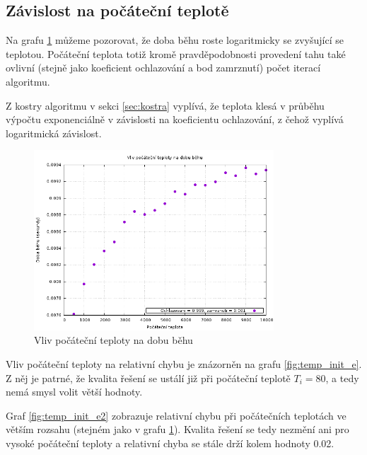 \documentclass[11pt]{article}
\begin{document}
\subsection{Závislost na počáteční teplotě}
\label{sec:temp}

Na grafu \ref{fig:temp_init} můžeme pozorovat, že doba běhu roste logaritmicky se zvyšující se teplotou. Počáteční teplota totiž kromě pravděpodobnosti provedení tahu také ovlivní (stejně jako koeficient ochlazování a bod zamrznutí) počet iterací algoritmu. 

Z kostry algoritmu v sekci \ref{sec:kostra} vyplívá, že teplota klesá v průběhu výpočtu exponenciálně v závislosti na koeficientu ochlazování, z čehož vyplívá logaritmická závislost.

\begin{figure}[h!]
	\centering
    	\includegraphics[width=0.8\textwidth]{../grafy/temp_init.png}
	\caption{Vliv počáteční teploty na dobu běhu}
	\label{fig:temp_init}
\end{figure}

Vliv počáteční teploty na relativní chybu je znázorněn na grafu \ref{fig:temp_init_e}. Z něj je patrné, že kvalita 
řešení se ustálí již při počáteční teplotě $T_i = 80$, a tedy nemá smysl volit větší hodnoty.

Graf \ref{fig:temp_init_e2} zobrazuje relativní chybu při počátečních teplotách ve větším rozsahu (stejném jako v grafu \ref{fig:temp_init}). Kvalita řešení se tedy nezmění ani pro vysoké počáteční teploty a relativní chyba se stále drží kolem hodnoty 0.02.
\end{document}
